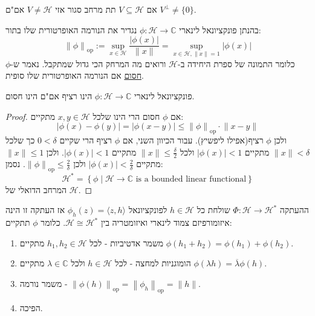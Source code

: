 \documentclass{tstextbook}
\begin{document}
\begin{corollary}
אם \(V\subseteq \mathcal{H}\) תת מרחב סגור אזי \(V \neq \mathcal{H}\) אם"ם \(V^{\perp}\neq \{ 0 \}\).

\end{corollary}
\begin{definition}
בהנתן פונקציונאל לינארי \(\phi:\mathcal{H}\to \mathbb{C}\) נגדיר את הנורמה האופרטורית שלו בתור:
$$\left\lVert  \phi  \right\rVert _{\mathrm{op}} := \sup _{x \in \mathcal{H}} \frac{\left\lvert  \phi(x)  \right\rvert }{\lVert x \rVert }=\sup _{x \in \mathcal{H}, \lVert x \rVert =1} \left\lvert  \phi(x)  \right\rvert $$
כלומר התמונה של ספרת היחידה ב-\(\mathcal{H}\) ורואים מה המרחק הכי גדול שמתקבל. נאמר ש-\(\phi\)\underline{חסום} אם הנורמה האופרטורית שלו סופית.

\end{definition}
\begin{lemma}
פונקציונאל לינארי \(\phi:\mathcal{H}\to \mathbb{C}\) הינו רציף אם"ם הינו חסום.

\end{lemma}
\begin{proof}
אם \(\phi\) חסום הרי הינו שלכל \(x,y \in \mathcal{H}\) מתקיים:
$$\left\lvert  \phi(x)-\phi(y)  \right\rvert =\left\lvert  \phi(x-y)  \right\rvert \leq \left\lVert  \phi  \right\rVert _{\mathrm{op}}\cdot \lVert x-y \rVert $$
ולכן \(\phi\) רציף(אפילו ליפשיץ).
עבור הכיוון השני, אם \(\phi\) רציף הרי שקיים \(0< \delta\) כך שלכל \(\lVert x \rVert< \delta\) מתקיים \(\left\lvert  \phi(x)  \right\rvert<1\) ולכל \(\lVert x \rVert\leq \frac{\delta}{2}\) מתקיים \(\left\lvert  \phi(x)  \right\rvert<1\). 
ולכן \(\lVert x \rVert\leq 1\) מתקיים \(\left\lvert  \phi(x)  \right\rvert< \frac{2}{\delta}\) ולכן \(\left\lVert  \phi  \right\rVert_{\mathrm{op}}\leq \frac{2}{\delta}\). נסמן:
$$\mathcal{H}^{*}=\left\{  \phi \mid \mathcal{H}\to \mathbb{C}   \text{ is a bounded linear functional}\right\}$$
המרחב הדואלי של \(\mathcal{H}\).

\end{proof}
\begin{theorem}
ההעתקה \(\Phi:\mathcal{H}\to \mathcal{H}^{*}\) שולחת כל \(h \in \mathcal{H}\) לפונקציונאל \(\phi_{h}(z)=\langle z,h \rangle\) אז העתקה זו הינה איזומורפיזם צמוד לינארי ואיזומטריה בין \(\mathcal{H} \cong \mathcal{H}^{*}\). כלומר \(\phi\) תתקיים:

  \begin{enumerate}
    \item משמר אדטיביות - לכל \(h_{1},h_{2} \in \mathcal{H}\) מתקיים \(\phi(h_{1}+h_{2})=\phi(h_{1})+\phi(h_{2})\). 


    \item הומוגניות למחצה - לכל \(h \in \mathcal{H}\) ולכל \(\lambda \in \mathbb{C}\) מתקיים \(\phi\left( \lambda h \right)=\overline{\lambda}\phi(h)\). 


    \item משמר נורמה - \(\left\lVert  \phi(h)  \right\rVert_{\mathrm{op}}=\left\lVert  \phi_{h}  \right\rVert_{\mathrm{op}}=\lVert h \rVert\). 


    \item הפיכה. 


  \end{enumerate}
\end{theorem}
\end{document}
